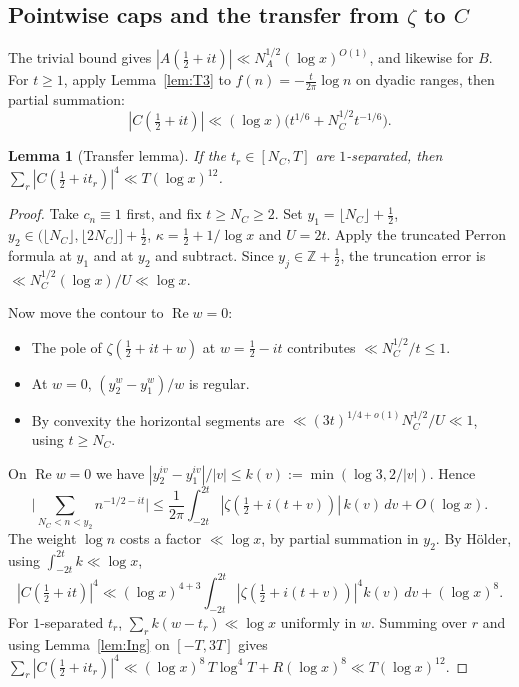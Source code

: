 \documentclass[11pt]{amsart}
\newtheorem{lemma}[theorem]{Lemma}
\theoremstyle{definition}
\theoremstyle{remark}
\begin{document}
\subsection{Pointwise caps and the transfer from $\zeta$ to $C$}

The trivial bound gives $|A(\frac12+it)|\ll N_A^{1/2}(\log x)^{O(1)}$, and likewise for $B$. For $t\ge1$, apply Lemma~\ref{lem:T3}
to $f(n)=-\frac{t}{2\pi}\log n$ on dyadic ranges, then partial summation:
\begin{equation}\label{eq:Ccap}
|C(\tfrac12+it)|\ll(\log x)\big(t^{1/6}+N_C^{1/2}t^{-1/6}\big).
\end{equation}

\begin{lemma}[Transfer lemma]\label{lem:Z}
If the $t_r\in[N_C,T]$ are $1$-separated, then $\sum_r|C(\frac12+it_r)|^4\ll T(\log x)^{12}$.
\end{lemma}

\begin{proof}
Take $c_n\equiv1$ first, and fix $t\ge N_C\ge2$. Set $y_1=\lfloor N_C\rfloor+\frac12$, $y_2\in(\lfloor N_C\rfloor,\lfloor2N_C\rfloor]+\frac12$, $\kappa=\frac12+1/\log x$ and $U=2t$.
Apply the truncated Perron formula at $y_1$ and at $y_2$ and subtract. Since $y_j\in\mathbb Z+\frac12$, the truncation error is
$\ll N_C^{1/2}(\log x)/U\ll\log x$.

Now move the contour to $\operatorname{Re}w=0$:
\begin{itemize}[leftmargin=*]
\item The pole of $\zeta(\frac12+it+w)$ at $w=\frac12-it$ contributes $\ll N_C^{1/2}/t\le1$.
\item At $w=0$, $(y_2^w-y_1^w)/w$ is regular.
\item By convexity the horizontal segments are $\ll(3t)^{1/4+o(1)}N_C^{1/2}/U\ll1$, using $t\ge N_C$.
\end{itemize}
On $\operatorname{Re}w=0$ we have $|y_2^{iv}-y_1^{iv}|/|v|\le k(v):=\min(\log3,2/|v|)$. Hence
\[
\Big|\sum_{N_C<n<y_2}n^{-1/2-it}\Big|\le\frac1{2\pi}\int_{-2t}^{2t}|\zeta(\tfrac12+i(t+v))|\,k(v)\,dv+O(\log x).
\]
The weight $\log n$ costs a factor $\ll\log x$, by partial summation in $y_2$. By H\"older, using $\int_{-2t}^{2t}k\ll\log x$,
\[
|C(\tfrac12+it)|^4\ll(\log x)^{4+3}\int_{-2t}^{2t}|\zeta(\tfrac12+i(t+v))|^4k(v)\,dv+(\log x)^{8}.
\]
For $1$-separated $t_r$, $\sum_rk(w-t_r)\ll\log x$ uniformly in $w$. Summing over $r$ and using Lemma~\ref{lem:Ing} on $[-T,3T]$ gives
$\sum_r|C(\frac12+it_r)|^4\ll(\log x)^{8}\,T\log^4T+R(\log x)^8\ll T(\log x)^{12}$.
\end{proof}
\end{document}

